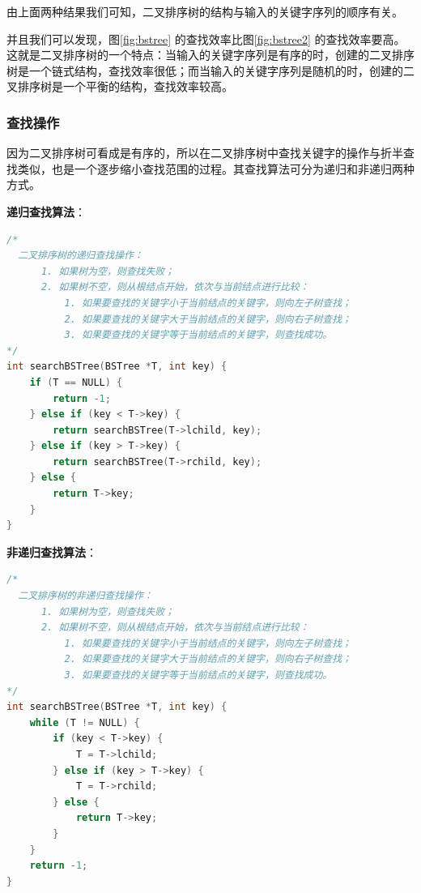 \documentclass[lang=cn,newtx,10pt,scheme=chinese]{elegantbook}
\begin{document}
由上面两种结果我们可知，二叉排序树的结构与输入的关键字序列的顺序有关。

并且我们可以发现，图\ref{fig:bstree} 的查找效率比图\ref{fig:bstree2} 的查找效率要高。
这就是二叉排序树的一个特点：当输入的关键字序列是有序的时，创建的二叉排序树是一个链式结构，查找效率很低；而当输入的关键字序列是随机的时，创建的二叉排序树是一个平衡的结构，查找效率较高。



\subsubsection{查找操作}

因为二叉排序树可看成是有序的，所以在二叉排序树中查找关键字的操作与折半查找类似，也是一个逐步缩小查找范围的过程。其查找算法可分为递归和非递归两种方式。

\textbf{递归查找算法}：

\begin{lstlisting}[language=C++, caption={二叉排序树的递归查找操作}]
  /*
  二叉排序树的递归查找操作：
      1. 如果树为空，则查找失败；
      2. 如果树不空，则从根结点开始，依次与当前结点进行比较：
          1. 如果要查找的关键字小于当前结点的关键字，则向左子树查找；
          2. 如果要查找的关键字大于当前结点的关键字，则向右子树查找；
          3. 如果要查找的关键字等于当前结点的关键字，则查找成功。
*/
int searchBSTree(BSTree *T, int key) {
    if (T == NULL) {
        return -1;
    } else if (key < T->key) {
        return searchBSTree(T->lchild, key);
    } else if (key > T->key) {
        return searchBSTree(T->rchild, key);
    } else {
        return T->key;
    }
}
\end{lstlisting}

\textbf{非递归查找算法}：

\begin{lstlisting}[language=C++, caption={二叉排序树的非递归查找操作}]
  /*
  二叉排序树的非递归查找操作：
      1. 如果树为空，则查找失败；
      2. 如果树不空，则从根结点开始，依次与当前结点进行比较：
          1. 如果要查找的关键字小于当前结点的关键字，则向左子树查找；
          2. 如果要查找的关键字大于当前结点的关键字，则向右子树查找；
          3. 如果要查找的关键字等于当前结点的关键字，则查找成功。
*/
int searchBSTree(BSTree *T, int key) {
    while (T != NULL) {
        if (key < T->key) {
            T = T->lchild;
        } else if (key > T->key) {
            T = T->rchild;
        } else {
            return T->key;
        }
    }
    return -1;
}
\end{lstlisting}
\end{document}
